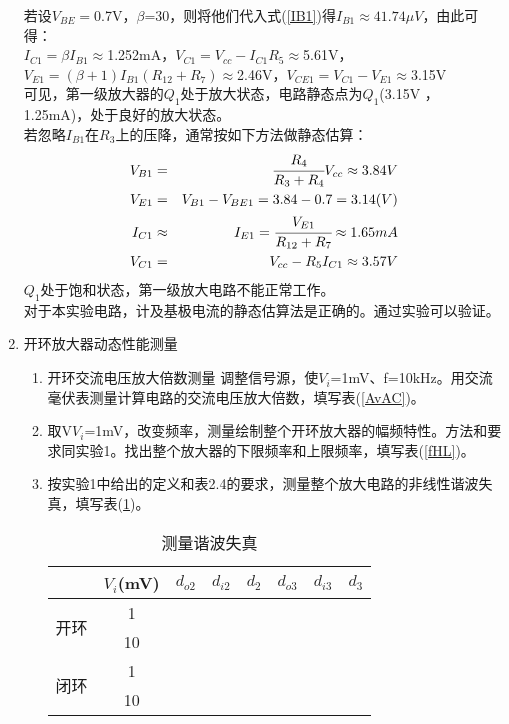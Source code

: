 \documentclass[a4paper]{article}
\begin{document}
\begin{enumerate}
若设$V_{BE}=$0.7V，$\beta$=30，则将他们代入式(\ref{IB1})得$I_{B1}\approx 41.74\mu V$，由此可得：\\
$I_{C1} = \beta I_{B1}\approx$1.252mA，$V_{C1} = V_{cc} - I_{C1}R_5\approx$5.61V，$V_{E1} = (\beta+1)I_{B1}(R_{12}+R_7)\approx$2.46V，$V_{CE1} = V_{C1} - V_{E1}\approx$3.15V\\
可见，第一级放大器的$Q_1$处于放大状态，电路静态点为$Q_1$(3.15V ，1.25mA)，处于良好的放大状态。\\
若忽略$I_{B1}$在$R_3$上的压降，通常按如下方法做静态估算：\\
\begin{eqnarray}
V_{B1} &=& \cfrac{R_4}{R_3+R_4}V_{cc} \approx3.84V\\
V_{E1} &=& V_{B1} - V_{BE1} =3.84-0.7 = 3.14(V)\\
I_{C1} &\approx& I_{E1} = \cfrac{V_{E1}}{R_{12}+R_7}\approx1.65mA\\
V_{C1} &=& V_{cc} - R_5I_{C1}\approx3.57V
\end{eqnarray}
$Q_1$处于饱和状态，第一级放大电路不能正常工作。\\
对于本实验电路，计及基极电流的静态估算法是正确的。通过实验可以验证。
\item 开环放大器动态性能测量
\begin{enumerate}
\item 开环交流电压放大倍数测量
调整信号源，使$V_i$=1mV、f=10kHz。用交流毫伏表测量计算电路的交流电压放大倍数，填写表(\ref{AvAC})。
\item 取V$V_i$=1mV，改变频率，测量绘制整个开环放大器的幅频特性。方法和要求同实验1。找出整个放大器的下限频率和上限频率，填写表(\ref{fHL})。
\item 按实验1中给出的定义和表2.4的要求，测量整个放大电路的非线性谐波失真，填写表(\ref{harmonic})。
\begin{table}[!h]
\centering
\caption{测量谐波失真}
\label{harmonic}
\begin{tabular}{|c|c|c|c|c|c|c|c|}
\hline
                    & $V_i$(mV) & $d_{o2}$ & $d_{i2}$ & $d_2$ & $d_{o3}$ & $d_{i3}$ & $d_3$ \\ \hline
\multirow{2}{*}{开环} & 1         &          &          &       &          &         &       \\ \cline{2-8} 
                    & 10        &          &          &       &          &         &       \\ \hline
\multirow{2}{*}{闭环} & 1         &          &          &       &          &         &       \\ \cline{2-8} 
                    & 10        &          &          &       &          &         &       \\ \hline

\end{tabular}
\end{table}
\end{enumerate}
\end{enumerate}
\end{document}
